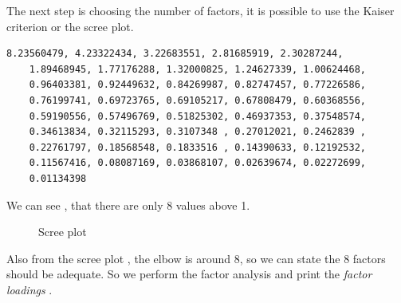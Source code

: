 The next step is choosing the number of factors, it is possible to use the Kaiser criterion or the scree plot.

\begin{lstlisting}[caption=Eigenvalues vector, label=lst:eig, numbers=none]
    8.23560479, 4.23322434, 3.22683551, 2.81685919, 2.30287244,
    1.89468945, 1.77176288, 1.32000825, 1.24627339, 1.00624468,
    0.96403381, 0.92449632, 0.84269987, 0.82747457, 0.77226586,
    0.76199741, 0.69723765, 0.69105217, 0.67808479, 0.60368556,
    0.59190556, 0.57496769, 0.51825302, 0.46937353, 0.37548574,
    0.34613834, 0.32115293, 0.3107348 , 0.27012021, 0.2462839 ,
    0.22761797, 0.18568548, 0.1833516 , 0.14390633, 0.12192532,
    0.11567416, 0.08087169, 0.03868107, 0.02639674, 0.02272699,
    0.01134398
\end{lstlisting}

We can see , that there are only 8 values above 1.

\begin{figure}[H]
    \label{fig:scree}
    \caption{Scree plot} 
\end{figure}

Also from the scree plot , the elbow is around 8, so we can state the 8 factors should be adequate.
So we perform the factor analysis and print the \textit{factor loadings} .

